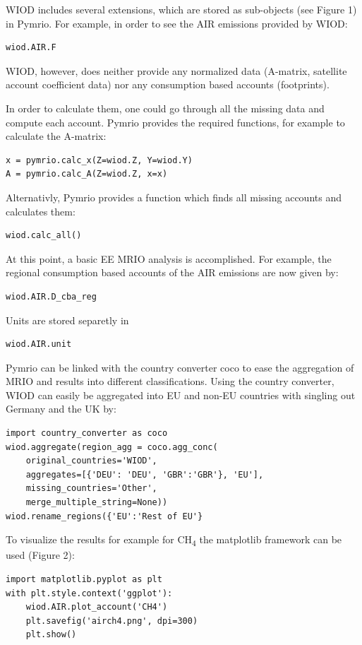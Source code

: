 \documentclass{jors}
\begin{document}
{WIOD includes several extensions, which are stored as sub-objects (see Figure 1) in Pymrio. 
For example, in order to see the AIR emissions provided by WIOD:

\begin{lstlisting}
wiod.AIR.F
\end{lstlisting}

WIOD, however, does neither provide any normalized data (A-matrix, satellite account coefficient data) nor any consumption based accounts (footprints).

In order to calculate them, one could go through all the missing data and compute each account. 
Pymrio provides the required functions, for example to calculate the A-matrix:
\begin{lstlisting}
x = pymrio.calc_x(Z=wiod.Z, Y=wiod.Y)
A = pymrio.calc_A(Z=wiod.Z, x=x)
\end{lstlisting}

Alternativly, Pymrio provides a function which finds all missing accounts and calculates them:
\begin{lstlisting}
wiod.calc_all()
\end{lstlisting}

At this point, a basic EE MRIO analysis is accomplished. For example, the regional consumption based accounts of the AIR emissions are now given by:
\begin{lstlisting}
wiod.AIR.D_cba_reg
\end{lstlisting}

Units are stored separetly in 
\begin{lstlisting}
wiod.AIR.unit
\end{lstlisting}

Pymrio can be linked with the country converter coco \cite{stadler2017} to ease the aggregation of MRIO and results into different classifications.
Using the country converter, WIOD can easily be aggregated into EU and non-EU countries with singling out Germany and the UK by:

\begin{lstlisting}
import country_converter as coco
wiod.aggregate(region_agg = coco.agg_conc(
    original_countries='WIOD',
    aggregates=[{'DEU': 'DEU', 'GBR':'GBR'}, 'EU'],
    missing_countries='Other',
    merge_multiple_string=None))
wiod.rename_regions({'EU':'Rest of EU'}
\end{lstlisting}

To visualize the results for example for CH\textsubscript{4} the matplotlib framework \cite{hunter2007} can be used (Figure 2):
\begin{lstlisting}
import matplotlib.pyplot as plt
with plt.style.context('ggplot'):
    wiod.AIR.plot_account('CH4')
    plt.savefig('airch4.png', dpi=300)
    plt.show()
\end{lstlisting}


}
\end{document}
